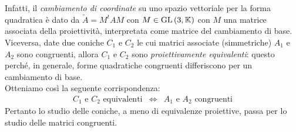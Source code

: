 Infatti, il \textit{cambiamento di coordinate} su uno spazio vettoriale per la forma quadratica è dato da $\widetilde{A}=M^tAM$ con $M\in\operatorname{GL}\left(3,\mathbb{K}\right)$ con $M$ una matrice associata della proiettività, interpretata come matrice del cambiamento di base.\\
Viceversa, date due coniche $C_1$ e $C_2$ le cui matrici associate (simmetriche) $A_1$ e $A_2$ sono congruenti, allora $C_1$ e $C_2$ sono \textit{proiettivamente equivalenti}:  questo perché, in generale, forme quadratiche congruenti differiscono per un cambiamento di base.\\
Otteniamo così la seguente corrispondenza:
\begin{equation*}
\begin{array}{ccc}
C_1\text{ e }C_2\text{ equivalenti}& \iff & A_1\text{ e }A_2\text{ congruenti}
\end{array}
\end{equation*}
Pertanto lo studio delle coniche, a meno di equivalenze proiettive, passa per lo studio delle matrici congruenti.
